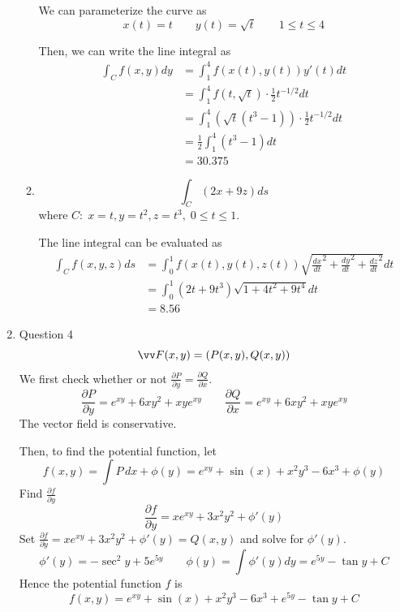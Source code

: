 \documentclass[11pt]{article}
\newcommand{\partialderiv}[2] {\frac{\partial #1}{\partial #2}}
\begin{document}
\begin{enumerate}
\begin{enumerate}
        We can parameterize the curve as
        $$
        x(t) = t \qquad y(t) = \sqrt{t} \qquad 1 \leq t \leq 4
        $$
        
        Then, we can write the line integral as
        $$
        \begin{aligned}
            \int_C f(x,y) dy &= \int_1^4 f(x(t),y(t)) y'(t) dt \\
            &= \int_1^4 f(t,\sqrt{t}) \cdot \frac{1}{2}t^{-1/2} dt \\
            &= \int_1^4 (\sqrt{t}(t^3-1)) \cdot \frac{1}{2}t^{-1/2} dt \\
            &= \frac{1}{2} \int_1^4 (t^3-1) dt \\
            &= 30.375
        \end{aligned}
        $$
        
        \item
        $$
        \int_C (2x+9z) ds
        $$
        where $C:\; x=t, y=t^2, z=t^3,\; 0 \leq t \leq 1$.
        
        The line integral can be evaluated as
        $$
        \begin{aligned}
            \int_C f(x,y,z) ds &= \int_0^1 f(x(t),y(t),z(t)) \sqrt{\frac{dx}{dt}^2 + \frac{dy}{dt}^2 + \frac{dz}{dt}^2} dt \\
            &= \int_0^1 (2t+9t^3) \sqrt{1+4t^2+9t^4} dt \\
            &= 8.56
        \end{aligned}
        $$
    \end{enumerate}
    
    \item Question 4
    $$
    \vv F(x,y) = (P(x,y), Q(x,y))
    $$
    We first check whether or not $\partialderiv{P}{y} = \partialderiv{Q}{x}$.
    $$
    \partialderiv{P}{y} = e^{xy} + 6xy^2 + xye^{xy} \qquad \partialderiv{Q}{x} = e^{xy} + 6xy^2 + xye^{xy}
    $$
    The vector field is conservative.
    
    Then, to find the potential function, let 
    $$
    f(x,y) = \int P\, dx + \phi(y) = e^{xy}+\sin(x)+x^2y^3-6x^3 + \phi(y)
    $$
    Find $\partialderiv{f}{y}$
    $$
    \partialderiv{f}{y} = xe^{xy} + 3x^2y^2 + \phi'(y)
    $$
    Set $\partialderiv{f}{y} = xe^{xy} + 3x^2y^2 + \phi'(y) = Q(x,y)$ and solve for $\phi'(y)$.
    $$
    \phi'(y) = -\sec^2 y + 5e^{5y} \qquad \phi(y) = \int \phi'(y) dy = e^{5y}-\tan y + C
    $$
    Hence the potential function $f$ is
    $$
    f(x,y) = e^{xy}+\sin(x)+x^2y^3-6x^3 + e^{5y}-\tan y + C
    $$
    

\end{enumerate}
\end{document}
